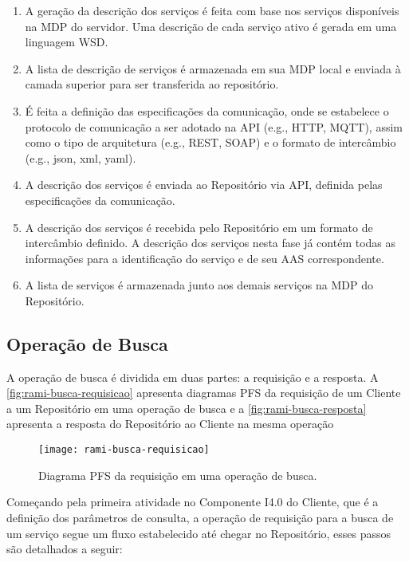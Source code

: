 	\begin{enumerate}
		\item A geração da descrição dos serviços é feita com base nos serviços disponíveis na MDP do servidor. Uma descrição de cada serviço ativo é gerada em uma linguagem WSD.
		\item A lista de descrição de serviços é armazenada em sua MDP local e enviada à camada superior para ser transferida ao repositório.
		\item É feita a definição das especificações da comunicação, onde se estabelece o protocolo de comunicação a ser adotado na API (e.g., HTTP, MQTT), assim como o tipo de arquitetura (e.g., REST, SOAP) e o formato de intercâmbio (e.g., json, xml, yaml).
		\item A descrição dos serviços é enviada ao Repositório via API, definida pelas especificações da comunicação.
		\item A descrição dos serviços é recebida pelo Repositório em um formato de intercâmbio definido. A descrição dos serviços nesta fase já contém todas as informações para a identificação do serviço e de seu AAS correspondente.
		\item A lista de serviços é armazenada junto aos demais serviços na MDP do Repositório.
	\end{enumerate}

\subsection{Operação de Busca}

	A operação de busca é dividida em duas partes: a requisição e a resposta. A \autoref{fig:rami-busca-requisicao} apresenta diagramas PFS da requisição de um Cliente a um Repositório em uma operação de busca e a \autoref{fig:rami-busca-resposta} apresenta a resposta do Repositório ao Cliente na mesma operação
	
	\begin{figure}[htb]
		\centering
		\caption{Diagrama PFS da requisição em uma operação de busca.}
		\label{fig:rami-busca-requisicao}
		\texttt{[image: rami-busca-requisicao]}
	\end{figure}

	Começando pela primeira atividade no Componente I4.0 do Cliente, que é a definição dos parâmetros de consulta, a operação de requisição para a busca de um serviço segue um fluxo estabelecido até chegar no Repositório, esses passos são detalhados a seguir:
	
